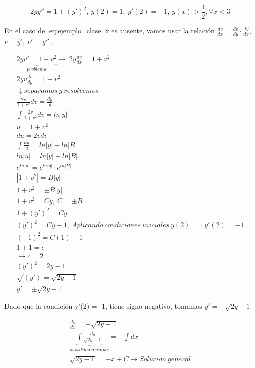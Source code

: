 \documentclass{article}
\begin{document}
\begin{equation}
2yy''= 1+ \left( y' \right)^2 ,  \ y(2) = 1, \  y' (2) = -1, \ y(x) > \frac{1}{2}, \forall x<3  \label{eq:ejemplo_clase}
\end{equation}

En el caso de \eqref{eq:ejemplo_clase} x es ausente, vamos usar la relación  $\frac{dv}{dx} = \frac{dv}{dy} \cdot \frac{dy}{dx}$, $v = y', \ v' = y''$ .

\begin{eqnarray}
\nonumber \underbrace{2yv' = 1 + v^2 }_{problema} \rightarrow \ 2y \frac{dv}{dx} = 1+v^2\\
\nonumber 2yv \frac{dv}{dy} = 1+v^2 \\
\nonumber \downarrow separamos \ y \ resolvemos\\
\nonumber \frac{2v}{1+v^2} dv = \frac{dy}{y} \\
\nonumber \int \frac{2v}{1+v^2} dv = ln |y| \\
\nonumber u =1+v^2 \\
\nonumber du = 2vdv \\
\nonumber \int \frac{du}{u} = ln|y| + ln|B| \\
\nonumber ln|u| = ln|y| + ln|B| \\
\nonumber e^{ln|u|} = e^{ln|y|} \cdot e^{ln|B|} \\
\nonumber |1 + v^2| = B |y| \\
\nonumber 1+v^2 = \pm B |y| \\
\nonumber 1+v^2 = Cy , \ C = \pm B \\
\nonumber 1+ (y')^2 = Cy \\
\nonumber (y')^2 = Cy -1 , \ Aplicando \ condiciones \ iniciales \ y(2)=1 \  y'(2) = -1 \\
\nonumber (-1)^2 = C(1)-1 \\
\nonumber 1+1 = c \\
\nonumber \rightarrow c =2 \\
\nonumber (y')^2 = 2y-1 \\
\nonumber \sqrt{(y')} = \sqrt{2y-1}\\
\nonumber y' = \pm \sqrt{2y-1}
\end{eqnarray}

Dado que la condición y'(2) = -1, tiene signo negativo, tomamos $y' = -\sqrt{2y-1}$

\begin{eqnarray}
\nonumber \frac{dy}{dx} = - \sqrt{2y-1}\\
\nonumber \underbrace{\int \frac{dy}{\sqrt{2y-1}} }_{sustitucion simple}  = - \int dx \\
\nonumber \sqrt{2y-1} = -x + C \rightarrow Solucion \ general \\ 
\end{eqnarray}
\end{document}
